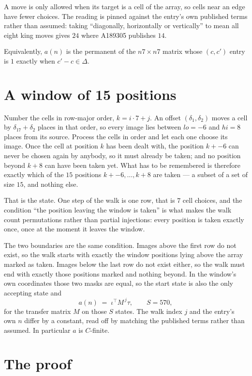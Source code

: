 \documentclass[11pt,a4paper]{article}
\theoremstyle{plain}
\theoremstyle{definition}
\begin{document}
A move is only allowed when its target is a cell of the array, so cells near an
edge have fewer choices. The reading is pinned against the entry's own published terms rather
than assumed: taking ``diagonally, horizontally or vertically'' to mean all eight king moves
gives $24$ where A189305 publishes $14$.

Equivalently, $a(n)$ is the permanent of the $n7\times n7$ matrix whose $(c,c')$ entry is
$1$ exactly when $c'-c\in\Delta$.

\section{A window of 15 positions}

Number the cells in row-major order, $k=i\cdot7+j$. An offset $(\delta_1,\delta_2)$ moves a
cell by $\delta_17+\delta_2$ places in that order, so every image lies between $lo=-6$ and
$hi=8$ places from its source. Process the cells in order and let each one choose its image.
Once the cell at position $k$ has been dealt with, the position $k+-6$ can never be chosen
again by anybody, so it must already be taken; and no position beyond $k+8$ can have been
taken yet. What has to be remembered is therefore exactly which of the $15$ positions
$k+-6,\dots,k+8$ are taken --- a subset of a set of size $15$, and nothing else.

That is the state. One step of the walk is one row, that is $7$ cell choices, and the
condition ``the position leaving the window is taken'' is what makes the walk count permutations
rather than partial injections: every position is taken exactly once, once at the moment it
leaves the window.

The two boundaries are the same condition. Images above the first row do not exist, so the walk
starts with exactly the window positions lying above the array marked as taken. Images below the
last row do not exist either, so the walk must end with exactly those positions marked and
nothing beyond. In the window's own coordinates those two masks are equal, so the start state is
also the only accepting state and
\[
a(n)\;=\;\iota^{\!\top}M^{\,j}\tau ,\qquad S=570,
\]
for the transfer matrix $M$ on those $S$ states. The walk index $j$ and the entry's own $n$
differ by a constant, read off by matching the published terms rather than assumed. In
particular $a$ is $C$-finite.

\section{The proof}
\end{document}
